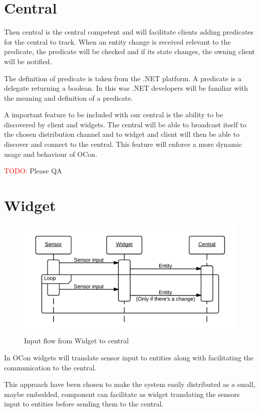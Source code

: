 \documentclass[]{report}
\newcommand\todo[1]{\textcolor{red}{TODO: }#1\PackageWarning{TODO:}{TODO tag!!}}
\begin{document}
\section{Central}

Then central is the central competent and will facilitate clients adding predicates for the central to track. When an entity change is received relevant to the predicate, the predicate will be checked and if its state changes, the owning client will be notified.

The definition of predicate is taken from the .NET platform. A predicate is a delegate returning a boolean. In this was .NET developers will be familiar with the meaning and definition of a predicate.

A important feature to be included with our central is the ability to be discovered by client and widgets. The central will be able to broadcast itself to the chosen distribution channel and to widget and client will then be able to discover and connect to the central. This feature will enforce a more dynamic usage and behaviour of OCon.

\todo Please QA
 

\section{Widget}

\begin{figure}
\centering
\includegraphics[width=\linewidth]{sequencediagram-widget.png}
\caption{Input flow from Widget to central}
\label{fig:seqwidget}
\end{figure}


In OCon widgets will translate sensor input to entities along with facilitating the communication to the central.

This approach have been chosen to make the system easily distributed as a small, maybe embedded, component can facilitate as widget translating the sensors input to entities before sending them to the central.
\end{document}
